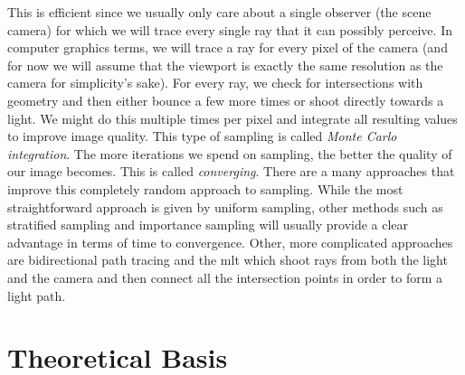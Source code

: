 \documentclass[
  twoside,
  11pt, a4paper,
  footinclude=true,
  headinclude=true,
  cleardoublepage=empty
]{scrreprt}
\begin{document}
This is efficient since we usually only care about a
single observer (the scene camera) for which we will trace every single ray that it can possibly
perceive. In computer graphics terms, we will trace a ray for every pixel of the camera (and for
now we will assume that the viewport is exactly the same resolution as the camera for simplicity's
sake). For every ray, we check for intersections with geometry and then either bounce a few more
times or shoot directly towards a light. We might do this multiple times per pixel and integrate
all resulting values to improve image
quality. This type of sampling is called \emph{Monte Carlo integration}.
The more iterations we spend on sampling, the better the
quality of our image becomes. This is called \emph{converging}.
There are a many approaches that improve this completely random approach to sampling. While the
most straightforward approach is given by uniform sampling, other methods such as stratified
sampling \cite{veach1997robust} and importance sampling \cite{veach1997robust} will usually provide
a clear advantage in terms of time to
convergence. Other, more complicated approaches are bidirectional path tracing
\cite{techreport:pbr} and the \ac{mlt} \cite{inproceedings:metropolis} which shoot rays from both
the light and the camera and then connect all the intersection points in order to form a light
path.

\section{Theoretical Basis}
\end{document}
